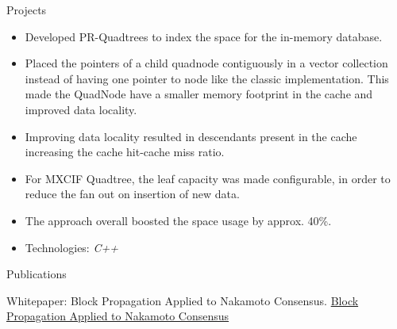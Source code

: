 \documentclass[]{mcdowellcv}
\begin{document}
    \begin{cvsection}{Projects}
        \begin{cvsubsection}{}{}{}
            \begin{cvsubsectionitem}
            \item {}
                \begin{itemize}
                    \item Developed PR-Quadtrees to index the space for the in-memory database.
                    \item Placed the pointers of a child quadnode contiguously in a vector collection instead of having
                        one pointer to node like the classic implementation. This made the QuadNode have a smaller
                        memory footprint in the cache and improved data locality.
                    \item Improving data locality resulted in descendants present in the cache increasing the cache
                        hit-cache miss ratio. 
                    \item For MXCIF Quadtree, the leaf capacity was made configurable, in order to reduce the fan out on
                        insertion of new data. 
                    \item  The approach overall boosted the space usage by approx. 40\%.
                    \item Technologies: \emph{C++}
                \end{itemize}
            \end{cvsubsectionitem}
        \end{cvsubsection}
    \end{cvsection}

    \begin{cvsection}{Publications}
        \begin{cvsubsection}{}{}{}
            \begin{cvsubsectionitem}
            \item Whitepaper: Block Propagation Applied to Nakamoto Consensus.
                \href{https://blockchain.asu.edu/block-propagation-applied-to-nakamoto-networks} {Block Propagation
                Applied to Nakamoto Consensus}
            \end{cvsubsectionitem}
        \end{cvsubsection}
    \end{cvsection}

\end{document}
